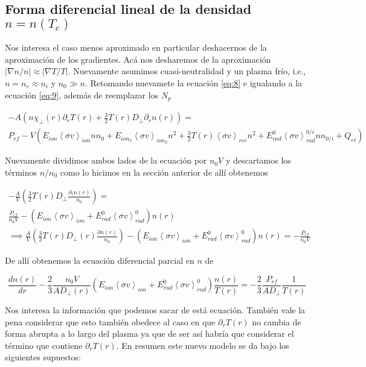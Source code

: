 \subsection{Forma diferencial lineal de la densidad $n = n(T_e)$}
  Nos interesa el caso menos aproximado en particular deshacernos de la aproximaci\'on de los gradientes. Ac\'a nos desharemos de la aproximaci\'on $|\nabla n /n| \approx |\nabla T /T|$. Nuevamente asumimos cuasi-neutralidad y un plasma fr\'io, i.e., $n = n_e \approx n_i$ y $n_0 \gg n$. Retomando nuevamete la ecuaci\'on \eqref{eq:8} e igualando a la ecuaci\'on \eqref{eq:9}, adem\'as de reemplazar los $N_p$

  \begin{eqnarray*}
    -A\left(n\chi_\perp(r)\partial_r T(r) + \frac{3}{2}T(r) D_\perp\partial_r n(r)\right) = \\ P_{rf} - V\left(E_{ion}\left<\sigma v\right>_{ion}nn_0 + E_{ion_2}\left<\sigma v\right>_{ion_2}n^2 + \frac{3}{2}T(r)\left<\sigma v\right>_{rec}n^2 + E_{rad}^0\left<\sigma v\right>_{rad}^{0/i}n n_{0/i} + Q_{ei}\right) 
  \end{eqnarray*}

  Nuevamente dividimos ambos lados de la ecuaci\'on por $n_0 V$ y descartamos los t\'erminos $n/n_0$ como lo hicimos en la secci\'on anterior de all\'i obtenemos

  \begin{eqnarray*}
    -\frac{A}{V}\left(\frac{3}{2} T(r) D_\perp\frac{\partial_r n(r)}{n_0}\right) = \\ \frac{P_{rf}}{n_0V} - \left(E_{ion}\left<\sigma v\right>_{ion} + E_{rad}^0\left<\sigma v\right>_{rad}^{0}\right)n(r) \\
    \implies \frac{A}{V}\left(\frac{3}{2} T(r) D_\perp(r)\frac{\partial n(r)}{n_0}\right) - \left(E_{ion}\left<\sigma v\right>_{ion} + E_{rad}^0\left<\sigma v\right>_{rad}^{0  }\right)n(r) = -\frac{P_{rf}}{n_0V}
    \end{eqnarray*}
 
    De all\'i obtenemos la ecuaci\'on diferencial parcial en $n$ de 

    \begin{equation}
      \frac{dn(r)}{dr} - \frac{2}{3}\frac{n_0 V}{AD_\perp(r)}\left(  E_{ion}\left<\sigma v\right>_{ion} + E_{rad}^0\left<\sigma v\right>_{rad}^0\right)\frac{n(r)}{T(r)} = - \frac{2}{3}\frac{P_{rf}}{AD_\perp}\frac{1}{T(r)}
    \end{equation}

  Nos interesa la informaci\'on que podemos sacar de est\'a ecuaci\'on. Tambi\'en vale la pena considerar que esto tambi\'en obedece al caso en que $\partial_r T(r)$ no cambia de forma abrupta a lo largo del plasma ya que de ser as\'i habr\'ia que considerar el t\'ermino que contiene $\partial_rT(r)$. En resumen este nuevo modelo se da bajo los siguientes supuestos:

